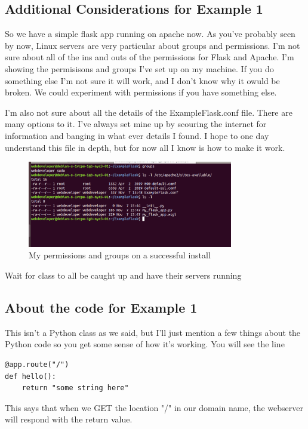 \documentclass[10pt]{article}
\begin{document}
\subsection{Additional Considerations for Example 1}
So we have a simple flask app running on apache now. As you've probably seen by now, Linux servers are very particular about groups and permissions. I'm not sure about all of the ins and outs of the permissions for Flask and Apache. I'm showing the permisisons and groups I've set up on my machine. If you do something else I'm not sure it will work, and I don't know why it owuld be broken. We could experiment with permissions if you have something else.


I'm also not sure about all the details of the ExampleFlask.conf file. There are many options to it. I've always set mine up by scouring the internet for information and banging in what ever details I found. I hope to one day understand this file in depth, but for now all I know is how to make it work.

\begin{figure}[h]
  \centering
    \includegraphics[width=0.8\textwidth]{groupsAndPermissions.png}
  \caption{My permissions and groups on a successful install}
\end{figure}

{\LARGE Wait for class to all be caught up and have their servers running}

\subsection{About the code for Example 1}
This isn't a Python class as we said, but I'll just mention a few things about the Python code so you get some sense of how it's working. You will see the line

\begin{lstlisting}[style=py]
@app.route("/")
def hello():
	return "some string here"
\end{lstlisting}
 
This says that when we GET the location "/" in our domain name, the webserver will respond with the return value.
\end{document}
